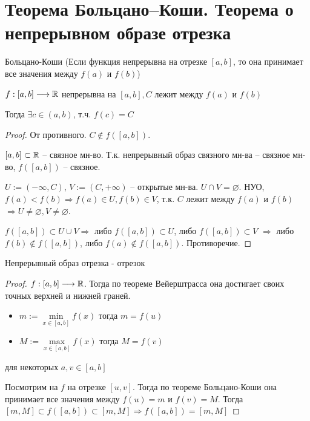 
\section{Теорема Больцано–Коши. Теорема о непрерывном образе отрезка}
\begin{theorem-non}
    Больцано-Коши (Если функция непрерывна на отрезке $[a, b]$, то она принимает все значения между $f(a)$ и $f(b)$)

    $f: [a, b] \longrightarrow \mathbb{R}$ непрерывна на $[a, b], C$ лежит между $f(a)$ и $f(b)$

    Тогда $\exists c\in (a, b)$, т.ч. $f(c) = C$
    \begin{proof} От противного. $C \notin f([a, b])$.

        $[a, b] \subset \mathbb{R}$ -- связное мн-во. Т.к. непрерывный образ связного 
        мн-ва -- связное мн-во, $f([a, b])$ -- связное. 
    
        $U := (-\infty, C)$, $V := (C, +\infty)$ -- открытые мн-ва.
        $U \cap V = \varnothing$. НУО, $f(a) < f(b) \Rightarrow
        f(a) \in U, f(b) \in V$, т.к. $C$ лежит между $f(a)$ и $f(b)$
        $\Rightarrow U \neq \varnothing, V \neq \varnothing$.
    
        $f([a, b]) \subset U \cup V \Rightarrow$ либо $f([a, b]) \subset U$,
        либо $f([a, b]) \subset V$ $\Rightarrow$ либо $f(b) \notin f([a, b])$,
        либо $f(a) \notin f([a, b])$. Противоречие.
    
    \end{proof}
\end{theorem-non}

\begin{theorem-non}
    Непрерывный образ отрезка - отрезок 

    \begin{proof} \quad

        $f:[a, b] \longrightarrow \mathbb{R}$.
        Тогда по теореме Вейерштрасса она достигает своих точных верхней и нижней граней.
        \begin{itemize}
            \item[] $m:= \min\limits_{x \in [a, b]}{f(x)}$ \qquad тогда $m = f(u)$
            \item[] $M:= \max\limits_{x \in [a, b]}{f(x)}$ \qquad тогда $M = f(v)$
        \end{itemize} для некоторых $a, v \in [a, b]$

        Посмотрим на $f$ на отрезке $[u, v]$. Тогда по теореме Больцано-Коши она принимает все значения между $f(u) = m$
        и $f(v) = M$. Тогда $[m, M] \subset f([a, b]) \subset [m, M] \Longrightarrow f([a, b]) = [m, M]$ 
    \end{proof}
\end{theorem-non}